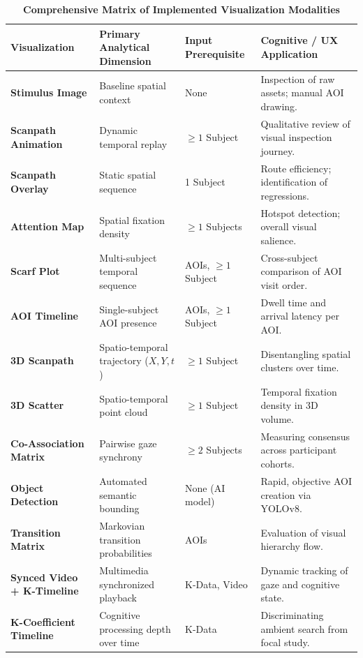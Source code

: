 \documentclass[11pt,a4paper]{article}
\begin{document}
\begin{table}[H]
    \centering
    \caption{\textbf{Comprehensive Matrix of Implemented Visualization Modalities}}
    \label{tab:viz_matrix}
    \footnotesize
    \begin{tabularx}{\linewidth}{l X l p{4.2cm}}
        \toprule
        \textbf{Visualization} & \textbf{Primary Analytical Dimension} & \textbf{Input Prerequisite} & \textbf{Cognitive / UX Application} \\
        \midrule
        \textbf{Stimulus Image} & Baseline spatial context & None & Inspection of raw assets; manual AOI drawing. \\
        \textbf{Scanpath Animation} & Dynamic temporal replay & $\ge 1$ Subject & Qualitative review of visual inspection journey. \\
        \textbf{Scanpath Overlay} & Static spatial sequence & 1 Subject & Route efficiency; identification of regressions. \\
        \textbf{Attention Map} & Spatial fixation density & $\ge 1$ Subjects & Hotspot detection; overall visual salience. \\
        \textbf{Scarf Plot} & Multi-subject temporal sequence & AOIs, $\ge 1$ Subject & Cross-subject comparison of AOI visit order. \\
        \textbf{AOI Timeline} & Single-subject AOI presence & AOIs, $\ge 1$ Subject & Dwell time and arrival latency per AOI. \\
        \textbf{3D Scanpath} & Spatio-temporal trajectory ($X, Y, t$) & $\ge 1$ Subject & Disentangling spatial clusters over time. \\
        \textbf{3D Scatter} & Spatio-temporal point cloud & $\ge 1$ Subject & Temporal fixation density in 3D volume. \\
        \textbf{Co-Association Matrix} & Pairwise gaze synchrony & $\ge 2$ Subjects & Measuring consensus across participant cohorts. \\
        \textbf{Object Detection} & Automated semantic bounding & None (AI model) & Rapid, objective AOI creation via YOLOv8. \\
        \textbf{Transition Matrix} & Markovian transition probabilities & AOIs & Evaluation of visual hierarchy flow. \\
        \textbf{Synced Video + K-Timeline} & Multimedia synchronized playback & K-Data, Video & Dynamic tracking of gaze and cognitive state. \\
        \textbf{K-Coefficient Timeline} & Cognitive processing depth over time & K-Data & Discriminating ambient search from focal study. \\
        \bottomrule
    \end{tabularx}
\end{table}
\end{document}
